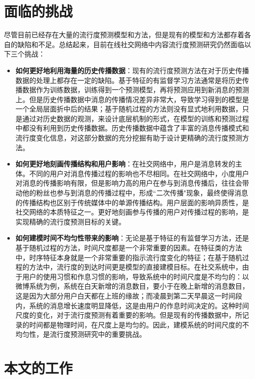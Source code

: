 \section{面临的挑战}
尽管目前已经存在大量的流行度预测模型和方法，但是现有的模型和方法都存着各自的缺陷和不足。总结起来，目前在线社交网络中内容流行度预测研究仍然面临以下三个挑战：
\begin{itemize} 
\item \textbf{如何更好地利用海量的历史传播数据}：现有的流行度预测方法在对于历史传播数据的处理上都存在一定的缺陷。基于特征的有监督学习方法通常是将历史传播数据作为训练数据，训练得到一个预测模型，再将预测应用到新消息的预测上。但是历史传播数据中消息的传播情况差异非常大，导致学习得到的模型是一个全局层面折中后的结果；基于随机过程的方法则没有显式地利用数据，只是通过对历史数据的观测，来设计底层机制的形式，在模型的训练和预测过程中都没有利用到历史传播数据。历史传播数据中蕴含了丰富的消息传播模式和流行度变化信息，对这部分数据的充分挖掘有助于设计更精确的流行度预测方法。
\item \textbf{如何更好地刻画传播结构和用户影响}：在社交网络中，用户是消息转发的主体。不同的用户对消息传播过程的影响也不尽相同。在社交网络中，小度用户对消息的传播影响有限，但是影响力高的用户在参与到消息传播后，往往会带动他的粉丝也参与到消息的传播过程中，形成``二次传播"现象，最终使得消息的传播结构也区别于传统媒体中的单源传播结构。用户层面的影响异质性，是社交网络的本质特征之一。更好地刻画参与传播的用户对传播过程的影响，是实现精确的流行度预测目标的关键。
\item \textbf{如何建模时间不均匀性带来的影响}：无论是基于特征的有监督学习方法，还是基于随机过程的方法，时间尺度都是一个非常重要的因素。在特征类的方法中，时序特征本身就是一个非常重要的指示流行度变化的特征；在基于随机过程的方法中，流行度的到达时间更是模型的直接建模目标。在社交系统中，由于用户的使用习惯和作息习惯的影响，导致系统中的时间尺度是不均匀的：以微博系统为例，系统在白天新增的消息数目，要小于在晚上新增的消息数目，这是因为大部分用户白天都在上班的缘故；而凌晨到第二天早晨这一时间段内，系统的消息增长速度明显降低，这是由用户的作息时间决定的。这种时间尺度的变化，对于流行度预测有着重要的影响。但是现有的传播数据中，所记录的时间都是物理时间，在尺度上是均匀的。因此，建模系统的时间尺度的不均匀性，是流行度预测研究中的重要挑战。
\end{itemize}

\section{本文的工作}
